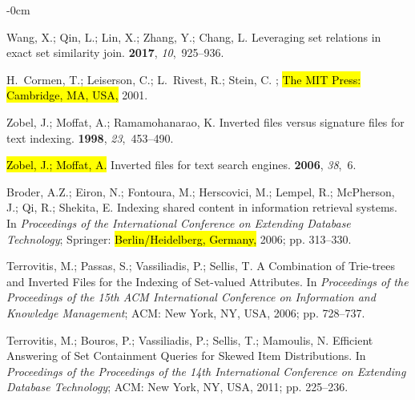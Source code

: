 \documentclass[algorithms,article,accept,pdftex,moreauthors]{Definitions/mdpi}
\begin{document}
\begin{adjustwidth}{-\extralength}{0cm}
\begin{thebibliography}{999}
Wang, X.; Qin, L.; Lin, X.; Zhang, Y.; Chang, L.
\newblock Leveraging set relations in exact set similarity join.
 {\bf 2017}, {\em
  10},~925--936.

H.~Cormen, T.; Leiserson, C.; L.~Rivest, R.; Stein, C.
; \hl{The MIT Press: Cambridge, MA, USA,} %
 2001.

Zobel, J.; Moffat, A.; Ramamohanarao, K.
\newblock Inverted files versus signature files for text indexing.
 {\bf 1998}, {\em
  23},~453--490.

\hl{Zobel, J.; Moffat, A.}
\newblock Inverted files for text search engines.
 {\bf 2006}, {\em 38},~6.

Broder, A.Z.; Eiron, N.; Fontoura, M.; Herscovici, M.; Lempel, R.; McPherson,
  J.; Qi, R.; Shekita, E.
\newblock Indexing shared content in information retrieval systems.
\newblock In \emph{Proceedings of the International Conference on Extending Database
  Technology}; Springer:  \hl{Berlin/Heidelberg, Germany,} %
  2006; pp. 313--330.

Terrovitis, M.; Passas, S.; Vassiliadis, P.; Sellis, T.
\newblock A Combination of Trie-trees and Inverted Files for the Indexing of
  Set-valued Attributes.
\newblock In \emph{Proceedings of the Proceedings of the 15th ACM International
  Conference on Information and Knowledge Management}; ACM: New York, NY, USA,
  2006; pp. 728--737.

Terrovitis, M.; Bouros, P.; Vassiliadis, P.; Sellis, T.; Mamoulis, N.
\newblock Efficient Answering of Set Containment Queries for Skewed Item
  Distributions.
\newblock In \emph{Proceedings of the Proceedings of the 14th International
  Conference on Extending Database Technology}; ACM: New York, NY, USA,  2011;
   pp. 225--236.


\end{thebibliography}
\end{adjustwidth}
\end{document}
